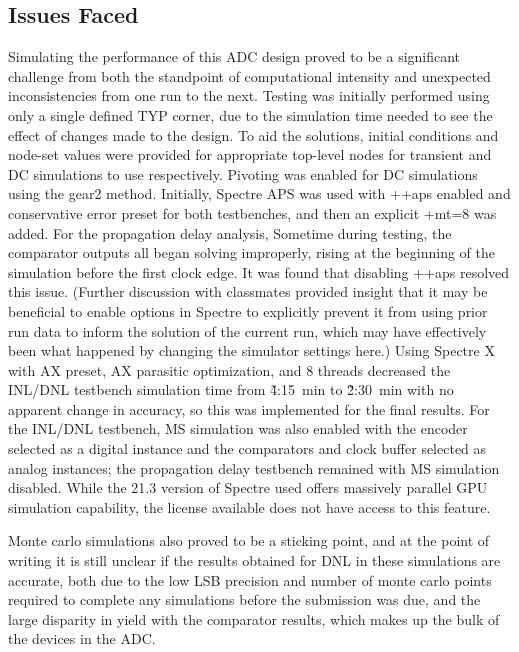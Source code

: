 \documentclass[11pt,letterpaper]{article}
\begin{document}
\subsection{Issues Faced}

Simulating the performance of this ADC design proved to be a significant challenge from both the standpoint of computational intensity and unexpected inconsistencies from one run to the next. Testing was initially performed using only a single defined TYP corner, due to the simulation time needed to see the effect of changes made to the design. To aid the solutions, initial conditions and node-set values were provided for appropriate top-level nodes for transient and DC simulations to use respectively. Pivoting was enabled for DC simulations using the gear2 method. Initially, Spectre APS was used with ++aps enabled and conservative error preset for both testbenches, and then an explicit +mt=8 was added. For the propagation delay analysis, Sometime during testing, the comparator outputs all began solving improperly, rising at the beginning of the simulation before the first clock edge. It was found that disabling ++aps resolved this issue. (Further discussion with classmates provided insight that it may be beneficial to enable options in Spectre to explicitly prevent it from using prior run data to inform the solution of the current run, which may have effectively been what happened by changing the simulator settings here.) Using Spectre X with AX preset, AX parasitic optimization, and 8 threads decreased the INL/DNL testbench simulation time from \~4:\qty{15}{min} to \~2:\qty{30}{min} with no apparent change in accuracy, so this was implemented for the final results. For the INL/DNL testbench, MS simulation was also enabled with the encoder selected as a digital instance and the comparators and clock buffer selected as analog instances; the propagation delay testbench remained with MS simulation disabled. While the 21.3 version of Spectre used offers massively parallel GPU simulation capability, the license available does not have access to this feature.

Monte carlo simulations also proved to be a sticking point, and at the point of writing it is still unclear if the results obtained for DNL in these simulations are accurate, both due to the low LSB precision and number of monte carlo points required to complete any simulations before the submission was due, and the large disparity in yield with the comparator results, which makes up the bulk of the devices in the ADC\@.
\end{document}
